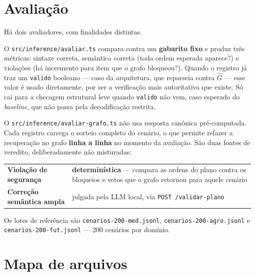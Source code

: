 \documentclass[11pt,a4paper]{article}
\newcommand{\arq}[1]{\texttt{\small #1}}
\begin{document}
\section{Avaliação}

Há dois avaliadores, com finalidades distintas.

O \arq{src/inference/avaliar.ts} compara contra um \textbf{gabarito fixo} e
produz três métricas: sintaxe correta, semântica correta (toda ordem esperada
aparece?) e violações (há incremento para item que o grafo bloqueou?). Quando o
registro já traz um \texttt{valido} booleano --- caso da arquitetura, que
reparseia contra $\hat{G}$ --- esse valor é usado diretamente, por ser a
verificação mais autoritativa que existe. Só cai para a checagem estrutural leve
quando \texttt{valido} não vem, caso esperado do \emph{baseline}, que não passa
pela decodificação restrita.

O \arq{src/inference/avaliar-grafo.ts} não usa resposta canônica pré-computada.
Cada registro carrega o sorteio completo do cenário, o que permite refazer a
recuperação no grafo \textbf{linha a linha} no momento da avaliação. São duas
fontes de veredito, deliberadamente não misturadas:

\begin{center}
\small
\begin{tabular}{@{}p{4.2cm}p{10.0cm}@{}}
\toprule
\textbf{Violação de segurança} & \textbf{determinística} --- compara as ordens do
plano contra os bloqueios e vetos que o grafo retornou para aquele cenário\\[3pt]
\textbf{Correção semântica ampla} & julgada pela LLM local, via
\texttt{POST /validar-plano}\\
\bottomrule
\end{tabular}
\end{center}

\vspace{2mm}

Os lotes de referência são \arq{cenarios-200-med.jsonl},
\arq{cenarios-200-agro.jsonl} e \arq{cenarios-200-fut.jsonl} --- 200 cenários por
domínio.

\section{Mapa de arquivos}
\end{document}
